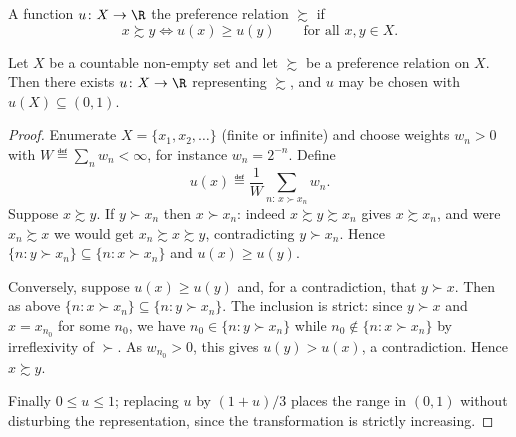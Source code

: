 \begin{definition}\label{def:utility-rep}
	A function $u\colon X\to\R$  the
	preference relation $\succsim$ if
	\[
		x\succsim y \iff u(x)\geq u(y)\qquad\text{for all }x,y\in X.
	\]
\end{definition}

\begin{theorem}\label{thm:utility-countable}
	Let $X$ be a countable non-empty set and let $\succsim$ be a preference relation
	on $X$. Then there exists $u\colon X\to\R$ representing $\succsim$, and $u$ may
	be chosen with $u(X)\subseteq(0,1)$.
\end{theorem}

\begin{proof}
	Enumerate $X=\{x_1,x_2,\dots\}$ (finite or infinite) and choose weights
	$w_n>0$ with $W\eqdef\sum_n w_n<\infty$, for instance $w_n=2^{-n}$. Define
	\[
		u(x)\eqdef\frac{1}{W}\sum_{n:\,x\succ x_n}w_n .
	\]
	Suppose $x\succsim y$. If $y\succ x_n$ then $x\succ x_n$: indeed
	$x\succsim y\succsim x_n$ gives $x\succsim x_n$, and were $x_n\succsim x$ we
	would get $x_n\succsim x\succsim y$, contradicting $y\succ x_n$. Hence
	$\{n : y\succ x_n\}\subseteq\{n : x\succ x_n\}$ and $u(x)\geq u(y)$.

	Conversely, suppose $u(x)\geq u(y)$ and, for a contradiction, that
	$y\succ x$. Then as above $\{n : x\succ x_n\}\subseteq\{n : y\succ x_n\}$. The
	inclusion is strict: since $y\succ x$ and $x=x_{n_0}$ for some $n_0$, we have
	$n_0\in\{n : y\succ x_n\}$ while $n_0\notin\{n : x\succ x_n\}$ by irreflexivity
	of $\succ$. As $w_{n_0}>0$, this gives $u(y)>u(x)$, a contradiction. Hence
	$x\succsim y$.

	Finally $0\leq u\leq1$; replacing $u$ by $(1+u)/3$ places the range in $(0,1)$
	without disturbing the representation, since the transformation is strictly
	increasing.
\end{proof}

